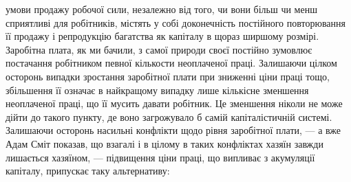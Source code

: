 умови продажу робочої сили, незалежно від того, чи вони більш
чи менш сприятливі для робітників, містять у собі доконечність
постійного повторювання її продажу і репродукцію багатства
як капіталу в щораз ширшому розмірі. Заробітна плата, як ми
бачили, з самої природи своєї постійно зумовлює постачання
робітником певної кількости неоплаченої праці. Залишаючи
цілком осторонь випадки зростання заробітної плати при зниженні
ціни праці тощо, збільшення її означає в найкращому
випадку лише кількісне зменшення неоплаченої праці, що її
мусить давати робітник. Це зменшення ніколи не може дійти до
такого пункту, де воно загрожувало б самій капіталістичній
системі. Залишаючи осторонь насильні конфлікти щодо рівня
заробітної плати, — а вже Адам Сміт показав, що взагалі і в цілому
в таких конфліктах хазяїн завжди лишається хазяїном, —
підвищення ціни праці, що випливає з акумуляції капіталу,
припускає таку альтернативу:

